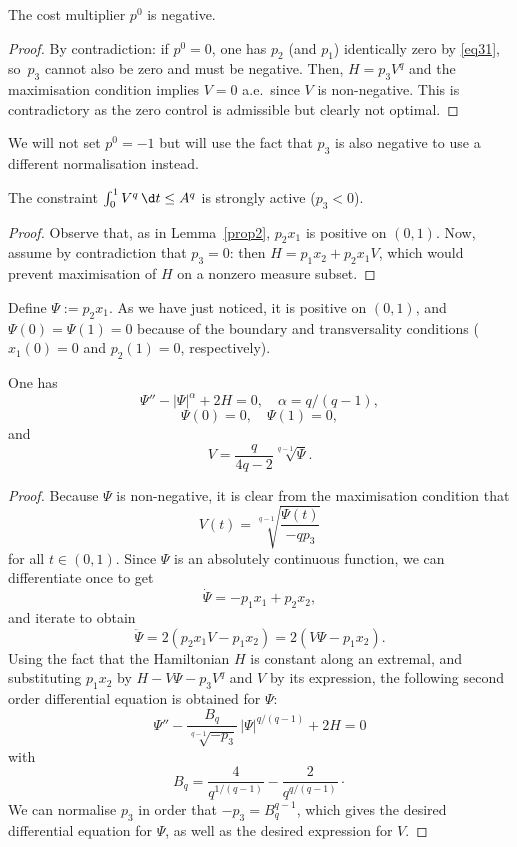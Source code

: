\begin{lemma}
The cost multiplier $p^0$ is negative.
\end{lemma}
\begin{proof}
By contradiction: if $p^0=0$, one has $p_2$ (and $p_1$) identically zero by
\eqref{eq31}, so~$p_3$ cannot also be zero and must be negative.
Then, $H=p_3 V^q$ and the
maximisation condition implies $V=0$ a.e.\ since $V$ is non-negative. This is
contradictory as the zero control is admissible but clearly not optimal.
\end{proof}

We will not set $p^0=-1$ but will use the fact that $p_3$ is also negative to use a
different normalisation instead.

\begin{lemma} \label{lem10}
The constraint $\int_0^1 V^q\,\d t \leq A^q$ is strongly active ($p_3<0$).
\end{lemma}
\begin{proof} Observe that, as in Lemma~\ref{prop2}, $p_2x_1$ is positive on $(0,1)$.
Now, assume by contradiction that $p_3=0$: then $H=p_1x_2+p_2x_1V$, which would
prevent maximisation of $H$ on a nonzero measure subset.
\end{proof}

Define $\Psi:=p_2x_1$. As we have just noticed, it is positive on $(0,1)$, and
$\Psi(0)=\Psi(1)=0$ because of the boundary and transversality conditions
($x_1(0)=0$ and $p_2(1)=0$, respectively).

\begin{prop} \label{prop20}
One has
\[
\Psi''-|\Psi|^\alpha+2H = 0,\quad \alpha=q/(q-1),
\]
\[
\Psi(0)=0,\quad \Psi(1)=0,
\]
and
\begin{equation} \label{eq90}
V = \frac{q}{4q-2}\sqrt[q-1]{\Psi}.
\end{equation}
\end{prop}
\begin{proof}
Because $\Psi$ is non-negative, it is clear
from the maximisation condition that
\[
V(t) = \sqrt[q-1]{\frac{\Psi(t)}{-qp_3}}
\]
for all $t \in (0,1)$. Since $\Psi$ is an absolutely continuous function, we can
differentiate once to get
\[
\dot{\Psi} = -p_1x_1+p_2x_2,
\]
and iterate to obtain
\[
\ddot{\Psi} = 2(p_2x_1V-p_1x_2) = 2(V\Psi-p_1x_2).
\]
Using the fact that the Hamiltonian $H$ is constant along an extremal, and
substituting $p_1x_2$ by $H-V\Psi-p_3V^q$ and $V$ by its expression, the
following second order differential equation is obtained for $\Psi$:
\[
\Psi''-\frac{B_q}{\sqrt[q-1]{-p_3}}\,|\Psi|^{q/(q-1)}+2H = 0
\]
with
\[
B_q = \frac{4}{q^{1/(q-1)}}-\frac{2}{q^{q/(q-1)}} \cdot
\]
We can normalise $p_3$ in order that $-p_3=B_q^{q-1}$, which gives the desired
differential equation for $\Psi$, as well as the desired expression for $V$.
\end{proof}

